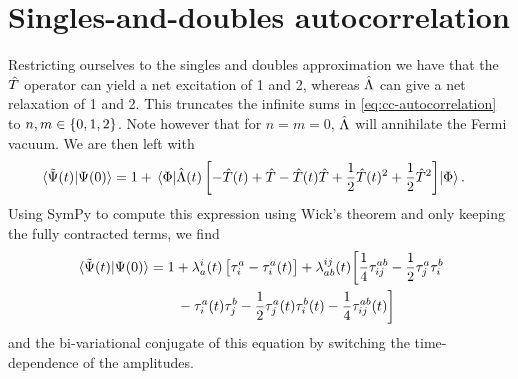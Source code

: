     \section{Singles-and-doubles autocorrelation}
        Restricting ourselves to the singles and doubles approximation we have
        that the $\hat{T}$ operator can yield a net excitation of 1 and 2,
        whereas $\hat{\Lambda}$ can give a net relaxation of 1 and 2.
        This truncates the infinite sums in \autoref{eq:cc-autocorrelation} to
        $n, m \in \left\{ 0, 1, 2 \right\}$.
        Note however that for $n = m = 0$, $\hat{\Lambda}$ will annihilate the Fermi
        vacuum.
        We are then left with
        \begin{align}
            \braket*{\tilde{\Psi}(t)}{\Psi(0)}
            &= 1
            + \mel*{\Phi}{
                \hat{\Lambda}(t)\left[ 
                    - \hat{T}(t) + \hat{T} - \hat{T}(t)\hat{T}
                    + \frac{1}{2} \hat{T}(t)^2 + \frac{1}{2} \hat{T}^2
                 \right]
            }{\Phi}.
        \end{align}
        Using SymPy \cite{sympy} to compute this expression using Wick's theorem
        and only keeping the fully contracted terms, we find
        \begin{align}
            \braket*{\tilde{\Psi}(t)}{\Psi(0)}
            &=
            1
            + \lambda^{i}_{a}(t) \left[ 
                \tau^{a}_{i} - \tau^{a}_{i}(t)
             \right]
            + \lambda^{ij}_{ab}(t) \biggl[
                \frac{1}{4}\tau^{ab}_{ij}
                - \frac{1}{2} \tau^{a}_{j} \tau^{b}_{i}
                \nonumber \\
                &\qquad
                - \tau^{a}_{i}(t) \tau^{b}_{j}
                - \frac{1}{2} \tau^{a}_{j}(t) \tau^{b}_{i}(t)
                - \frac{1}{4} \tau^{ab}_{ij}(t)
            \biggr]
        \end{align}
        and the bi-variational conjugate of this equation by switching the
        time-dependence of the amplitudes.

\clearemptydoublepage
